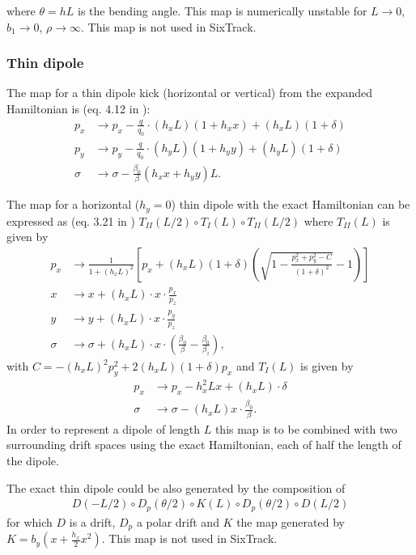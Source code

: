 \documentclass[english]{article}
\begin{document}
where $\theta=hL$ is the bending angle. This map is numerically unstable for $L\to0$, $b_1\to0$, $\rho\to\infty$.  This map is not used in SixTrack.


\subsubsection{Thin dipole}
The map for a thin dipole kick (horizontal or vertical) from the expanded Hamiltonian is 
(eq. 4.12 in \cite{heinemann95}):
\begin{align}
  p_x &\to p_x - \frac{q}{q_0} \cdot (h_xL)(1+h_xx) + (h_xL)(1+\delta) \\
  p_y &\to p_y - \frac{q}{q_0} \cdot (h_yL)(1+h_yy) + (h_yL)(1+\delta)\\
  \sigma &\to \sigma - \frac{\beta_0}{\beta} (h_xx + h_yy) L.
\end{align}

The map for a horizontal ($h_y=0$) thin dipole with the exact Hamiltonian
can be expressed as (eq. 3.21 in \cite{barber96})
$T_{II}(L/2)\circ T_I(L) \circ T_{II}(L/2)$ where $T_{II}(L)$ is given by
\begin{align}
    p_x &\to \frac{1}{1+(h_xL)^2} \left[p_x + (h_xL)(1+\delta) 
    \left(\sqrt{1-\frac{p_x^2+p_y^2-C}{(1+\delta)^2}}-1 \right)\right] \\
    x &\to x + (h_xL)\cdot x\cdot \frac{p_x}{p_z} \\
    y &\to y + (h_xL)\cdot x\cdot \frac{p_y}{p_z} \\
    \sigma &\to \sigma + (h_xL)\cdot x\cdot 
    \left(\frac{\beta_0}{\beta}-\frac{\beta_0}{\beta_z}\right),
\end{align}
with $C=-(h_xL)^2p_y^2+2(h_xL)(1+\delta)p_x$ and $T_{I}(L)$ is given by
\begin{align}
    p_x &\to p_x -h_x^2Lx + (h_xL)\cdot\delta \\
    \sigma &\to \sigma - (h_xL)x\cdot \frac{\beta_0}{\beta}.
\end{align}
In order to represent a dipole of length $L$ this map is to be combined with 
two surrounding drift spaces using the exact Hamiltonian, each of half the 
length of the dipole.

The exact thin dipole could be also generated by the composition of
\begin{align}
D(-L/2) \circ D_p(\theta/2) \circ K(L) \circ D_p(\theta/2) \circ  D(L/2)
\end{align}
for which $D$ is a drift, $D_p$ a polar drift and $K$ the map generated by
$ K=b_y(x +\frac{h_x}{2}x^2) $. This map is not used in SixTrack.
\end{document}
